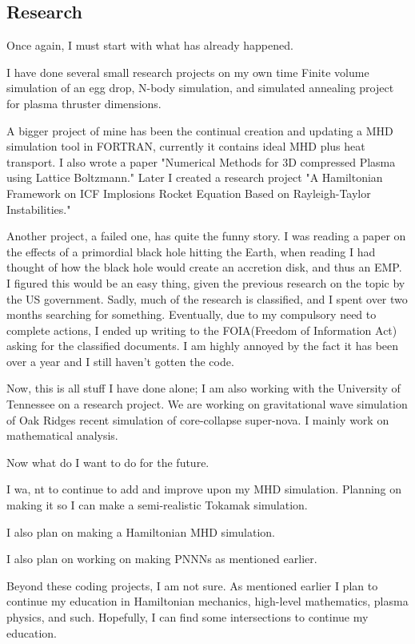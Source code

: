 \subsection{Research}
\par Once again, I must start with what has already happened. 
\par I have done several small research projects on my own time Finite volume simulation of an egg drop, N-body simulation, and simulated annealing project for plasma thruster dimensions.
\par A bigger project of mine has been the continual creation and updating a MHD simulation tool in FORTRAN, currently it contains ideal MHD plus heat transport. I also wrote a paper "Numerical Methods for 3D compressed Plasma using Lattice Boltzmann." Later I created a research project "A Hamiltonian Framework on ICF Implosions Rocket Equation Based on Rayleigh-Taylor Instabilities."
\par Another project, a failed one, has quite the funny story. I was reading a paper on the effects of a primordial black hole hitting the Earth, when reading I had thought of how the black hole would create an accretion disk, and thus an EMP. I figured this would be an easy thing, given the previous research on the topic by the US government. Sadly, much of the research is classified, and I spent over two months searching for something. Eventually, due to my compulsory need to complete actions, I ended up writing to the FOIA(Freedom of Information Act) asking for the classified documents. I am highly annoyed by the fact it has been over a year and I still haven't gotten the code. 
\par Now, this is all stuff I have done alone; I am also working with the University of Tennessee on a research project. We are working on gravitational wave simulation of Oak Ridges recent simulation of core-collapse super-nova. I mainly work on mathematical analysis. 
\par Now what do I want to do for the future.
\par I wa, nt to continue to add and improve upon my MHD simulation. Planning on making it so I can make a semi-realistic Tokamak simulation.
\par I also plan on making a Hamiltonian MHD simulation.
\par I also plan on working on making PNNNs as mentioned earlier.
\par Beyond these coding projects, I am not sure. As mentioned earlier I plan to continue my education in Hamiltonian mechanics, high-level mathematics, plasma physics, and such. Hopefully, I can find some intersections to continue my education.
